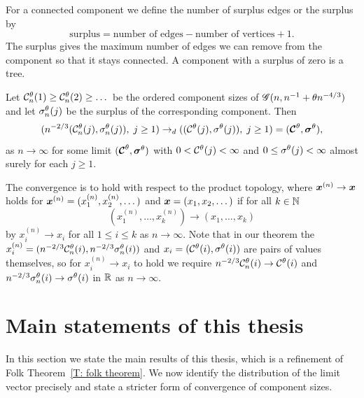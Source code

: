 For a connected component we define the number of surplus edges or the surplus by
\begin{equation}
	\text{surplus} = \text{number of edges} - \text{number of vertices} + 1.
\end{equation}
The surplus gives the maximum number of edges we can remove from the component so that it stays connected.
A component with a surplus of zero is a tree.

\begin{folktheorem} \label{T: folk theorem}
	Let $\mathcal{C}^{\theta}_n(1) \geq \mathcal{C}^{\theta}_n(2) \geq \dots$ be the ordered component sizes of
	$\mathscr{G}(n, n^{-1} + \theta n^{-4 / 3})$ and let $\mathcal{\sigma}^{\theta}_n(j)$ be the surplus of the corresponding component.
	Then
	\begin{equation}
		( n^{-2 / 3} ( \mathcal{C}^{\theta}_n(j), \mathcal{\sigma}^{\theta}_n(j) ), \; j \geq 1 ) 
		\rightarrow_d
		( (\mathcal{C}^{\theta}(j), \mathcal{\sigma}^{\theta}(j)), \; j \geq 1 )
		= ( \boldsymbol{\mathcal{C}}^{\theta}, \boldsymbol{\mathcal{\sigma}}^{\theta} ),
	\end{equation}
	as $n \rightarrow \infty$ for some limit $( \boldsymbol{\mathcal{C}}^{\theta}, \boldsymbol{\mathcal{\sigma}}^{\theta} )$
	with $0 < \mathcal{C}^{\theta}(j) < \infty$ and $0 \leq \mathcal{\sigma}^{\theta}(j) < \infty$ almost surely for each $j \geq 1$.
\end{folktheorem}

The convergence is to hold with respect to the product topology, 
where $\boldsymbol{x}^{(n)} \rightarrow \boldsymbol{x}$ holds for $\boldsymbol{x}^{(n)} = (x^{(n)}_1, x^{(n)}_2, \dots)$ and $\boldsymbol{x} = (x_1, x_2, \dots)$
if for all $k \in \mathbb{N}$
\begin{equation}
	(x^{(n)}_1, \dots, x^{(n)}_k) \rightarrow (x_1, \dots,  x_k)
\end{equation}
by $x^{(n)}_i \rightarrow x_i$ for all $1 \leq i \leq k$ as $n \rightarrow \infty$.
Note that in our theorem the $x^{(n)}_i = ( n^{-2 / 3} \mathcal{C}^{\theta}_n(i), n^{-2 / 3} \mathcal{\sigma}^{\theta}_n(i))$ and $x_i = (\mathcal{C}^{\theta}(i), \mathcal{\sigma}^{\theta}(i))$ are pairs of values themselves,
so for $x^{(n)}_i \rightarrow x_i$ to hold we require 
$n^{-2 / 3}  \mathcal{C}^{\theta}_n(i) \rightarrow \mathcal{C}^{\theta}(i)$ and $n^{-2 / 3} \mathcal{\sigma}^{\theta}_n(i) \rightarrow \mathcal{\sigma}^{\theta}(i)$ 
in $\mathbb{R}$ as $n \rightarrow \infty$.


\section{Main statements of this thesis}

In this section we state the main results of this thesis,
which is a refinement of Folk Theorem~\ref{T: folk theorem}.
We now identify the distribution of the limit vector precisely and state a stricter form of convergence of component sizes.

